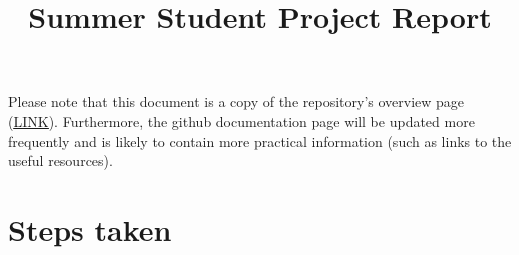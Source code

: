 \documentclass{customization}
\title{Summer Student Project Report}
\begin{document}

\UE{ }



        
\fairemarges 
\fairepagedegarde 

\begin{Large}
\end{Large}
\vspace{0.5cm}






\noindent
Please note that this document is a copy of the repository's overview page (\underline{\href{https://github.com/3sztof/cloud_computing}{LINK}}). Furthermore, the github documentation page will be updated more frequently and is likely to contain more practical information (such as links to the useful resources).

\section{Steps taken}
\end{document}
